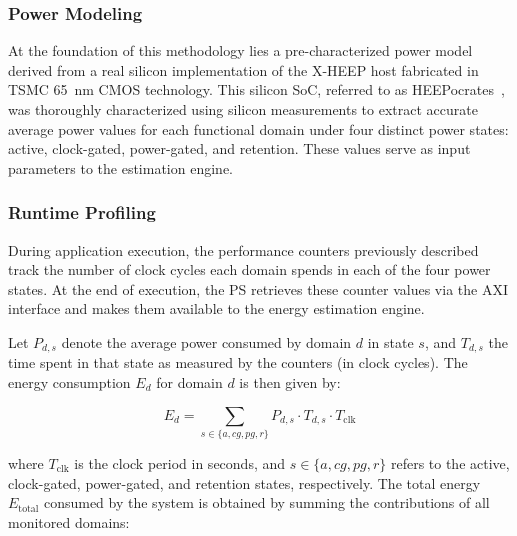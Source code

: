             \subsubsection*{Power Modeling}
            
                At the foundation of this methodology lies a pre-characterized power model derived from a real silicon implementation of the \mbox{X-HEEP} host fabricated in TSMC \SI{65}{\nano\meter} CMOS technology. This silicon SoC, referred to as \mbox{HEEPocrates}~\cite{heepocrates}, was thoroughly characterized using silicon measurements to extract accurate average power values for each functional domain under four distinct power states: active, clock-gated, power-gated, and retention. These values serve as input parameters to the estimation engine.
            
            \subsubsection*{Runtime Profiling}
            
                During application execution, the performance counters previously described track the number of clock cycles each domain spends in each of the four power states. At the end of execution, the PS retrieves these counter values via the AXI interface and makes them available to the energy estimation engine.
                
                Let \( P_{d,s} \) denote the average power consumed by domain \( d \) in state \( s \), and \( T_{d,s} \) the time spent in that state as measured by the counters (in clock cycles). The energy consumption \( E_d \) for domain \( d \) is then given by:

                \vspace{-2em}
                \begin{equation}
                    E_d = \sum_{s \in \{a, cg, pg, r\}} P_{d,s} \cdot T_{d,s} \cdot T_{\text{clk}}
                \end{equation}
                \vspace{-2em}
                
                where \( T_{\text{clk}} \) is the clock period in seconds, and \( s \in \{a, cg, pg, r\} \) refers to the active, clock-gated, power-gated, and retention states, respectively. The total energy \( E_{\text{total}} \) consumed by the system is obtained by summing the contributions of all monitored domains:

